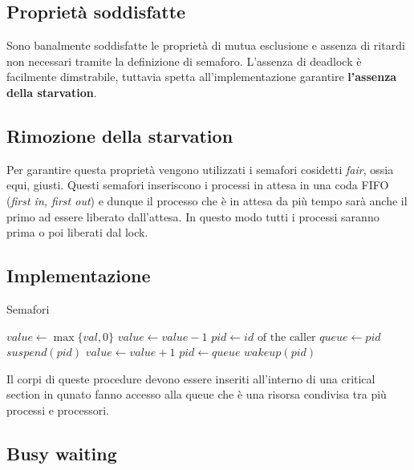 \documentclass{article}
\begin{document}
\subsection{Propriet\`a soddisfatte}

Sono banalmente soddisfatte le propriet\`a di mutua esclusione e assenza di
ritardi non necessari tramite la definizione di semaforo. L'assenza di deadlock
\`e facilmente dimstrabile, tuttavia spetta all'implementazione garantire
\textbf{l'assenza della starvation}.

\subsection{Rimozione della starvation}

Per garantire questa propriet\`a vengono utilizzati i semafori cosidetti \emph{fair},
ossia equi, giusti. Questi semafori inseriscono i processi in attesa in una coda
FIFO (\emph{first in, first out}) e dunque il processo che \`e in attesa da pi\`u
tempo sar\`a anche il primo ad essere liberato dall'attesa. In questo modo tutti
i processi saranno prima o poi liberati dal lock.

\subsection{Implementazione}\label{sem}

\begin{algorithm}[H]
  \caption{Semafori}
  \begin{algorithmic}[0]
      \State $value \gets \max \{val, 0\}$
    \EndProcedure
    \State
        \State $value \gets value - 1$
      \Else
        \State $pid \gets id \text{ of the caller}$
        \State $queue \gets pid$
        \State $suspend(pid)$
      \EndIf
    \EndProcedure
    \State
        \State $value \gets value + 1$
      \Else
        \State $pid \gets queue$
        \State $wakeup(pid)$
      \EndIf

    \EndProcedure
  \end{algorithmic}
\end{algorithm}

Il corpi di queste procedure devono essere inseriti all'interno di una critical
section in qunato fanno accesso alla queue che \`e una risorsa condivisa tra pi\`u
processi e processori.

\subsection{Busy waiting}
\end{document}
